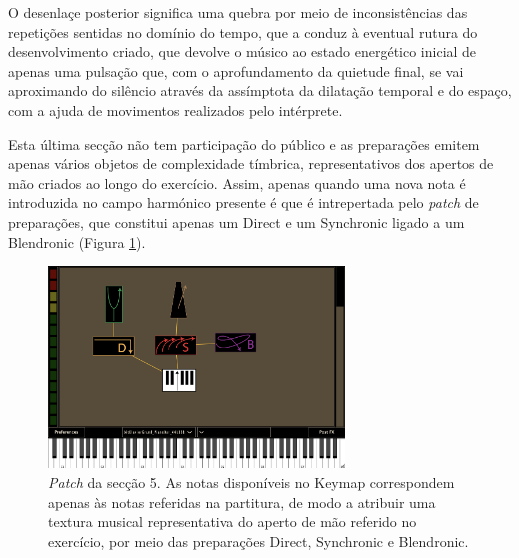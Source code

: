 \documentclass[../main.tex]{subfiles}
\begin{document}
O desenlaçe posterior significa uma quebra por meio de inconsistências das repetições sentidas no domínio do tempo, que a conduz à eventual rutura do desenvolvimento criado, que devolve o músico ao estado energético inicial de apenas uma pulsação que, com o aprofundamento da quietude final, se vai aproximando do silêncio através da assímptota da dilatação temporal e do espaço, com a ajuda de movimentos realizados pelo intérprete.

Esta última secção não tem participação do público e as preparações emitem apenas vários objetos de complexidade tímbrica, representativos dos apertos de mão criados ao longo do exercício. Assim, apenas quando uma nova nota é introduzida no campo harmónico presente é que é intrepertada pelo \textsl{patch} de preparações, que constitui apenas um Direct e um Synchronic ligado a um Blendronic (Figura \ref{fig:bit5}).

\begin{figure}[h]
    \centering
    \captionsetup{width=0.8\textwidth}
    \includegraphics[width=0.7\textwidth]{images/bit5.png}
    \caption{\textsl{Patch} da secção 5. As notas disponíveis no Keymap correspondem apenas às notas referidas na partitura, de modo a atribuir uma textura musical representativa do aperto de mão referido no exercício, por meio das preparações Direct, Synchronic e Blendronic.}
    \label{fig:bit5}
\end{figure}
\end{document}
